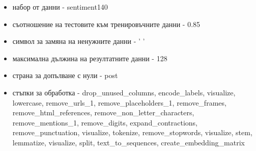 \documentclass{article}
\begin{document}
\begin{itemize}
  \begin{itemize}
    \item набор от данни - sentiment140
    \item съотношение на тестовите към тренировъчните данни - 0.85
    \item символ за замяна на ненужните данни - ' '
    \item максимална дължина на резултатните данни - 128
    \item страна за допълване с нули - post
    \item стъпки за обработка - drop\_unused\_columns, encode\_labels, visualize, lowercase, remove\_urls\_1,
    remove\_placeholders\_1, remove\_frames, remove\_html\_references, remove\_non\_letter\_characters,
    remove\_mentions\_1, remove\_digits, expand\_contractions, remove\_punctuation, visualize, tokenize,
    remove\_stopwords, visualize, stem, lemmatize, visualize, split, text\_to\_sequences, create\_embedding\_matrix
  \end{itemize}


\end{itemize}
\end{document}

